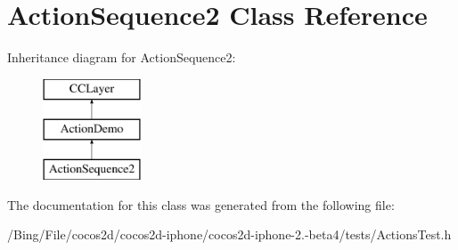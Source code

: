 \hypertarget{interface_action_sequence2}{\section{Action\-Sequence2 Class Reference}
\label{interface_action_sequence2}
}
Inheritance diagram for Action\-Sequence2\-:\begin{figure}[H]
\begin{center}
\leavevmode
\includegraphics[height=3.000000cm]{interface_action_sequence2}
\end{center}
\end{figure}


The documentation for this class was generated from the following file\-:\begin{DoxyCompactItemize}
\item 
/\-Bing/\-File/cocos2d/cocos2d-\/iphone/cocos2d-\/iphone-\/2.-\/beta4/tests/Actions\-Test.\-h\end{DoxyCompactItemize}
